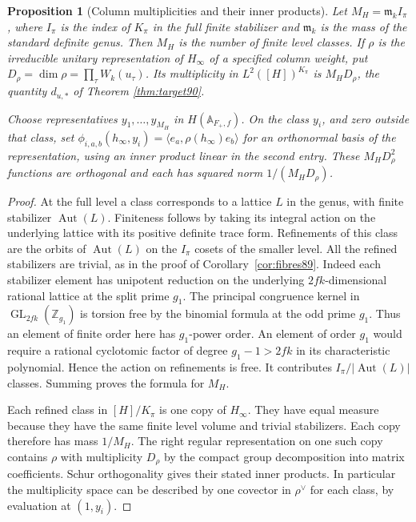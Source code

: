 \documentclass[a4paper,11pt]{article}
\newtheorem{proposition}{Proposition}[section]
\theoremstyle{definition}
\theoremstyle{remark}
\newcommand{\ZZ}{\mathbb Z}\newcommand{\ord}{\operatorname{ord}}
\numberwithin{equation}{section}
\newcommand{\Aut}{\operatorname{Aut}}
\newcommand{\GL}{\operatorname{GL}}
\begin{document}
\begin{proposition}[Column multiplicities and their inner products]\label{prop:column110}
Let \(M_H=\mathfrak m_k I_\pi\), where \(I_\pi\) is the index
of \(K_\pi\) in the full finite stabilizer and \(\mathfrak m_k\)
is the mass of the standard definite genus. Then \(M_H\) is the
number of finite level classes. If \(\rho\) is the irreducible
unitary representation of \(H_\infty\) of a specified column
weight, put \(D_\rho=\dim\rho=\prod_\tau W_k(u_\tau)\).
Its multiplicity in \(L^2([H])^{K_\pi}\) is \(M_HD_\rho\),
the quantity \(d_{u,*}\) of Theorem \ref{thm:target90}.

Choose representatives \(y_1,\ldots,y_{M_H}\) in
\(H(\mathbb A_{F_+,f})\). On the class \(y_i\), and zero outside
that class, set \(\phi_{i,a,b}(h_\infty,y_i)
=\langle e_a,\rho(h_\infty)e_b\rangle\) for an orthonormal
basis of the representation, using an inner product linear in
the second entry. These \(M_HD_\rho^2\) functions are orthogonal
and each has squared norm \(1/(M_HD_\rho)\).
\end{proposition}
\begin{proof}
At the full level a class corresponds to a lattice \(L\) in
the genus, with finite stabilizer \(\Aut(L)\). Finiteness
follows by taking its integral action on the underlying lattice
with its positive definite trace form. Refinements of this class
are the orbits of \(\Aut(L)\) on the \(I_\pi\) cosets of the
smaller level. All the refined stabilizers are trivial, as in
the proof of Corollary~\ref{cor:fibres89}. Indeed each stabilizer element has
unipotent reduction on the underlying \(2fk\)-dimensional
rational lattice at the split prime \(g_1\).
The principal congruence kernel in \(\GL_{2fk}(\ZZ_{g_1})\) is
torsion free by the binomial formula at the odd prime \(g_1\).
Thus an element of finite order here has \(g_1\)-power order.
An element of order \(g_1\) would require a rational cyclotomic
factor of degree \(g_1-1>2fk\) in its characteristic polynomial.
Hence the action on refinements is free. It contributes
\(I_\pi/|\Aut(L)|\) classes. Summing proves the formula for
\(M_H\).

Each refined class in \([H]/K_\pi\) is one copy of \(H_\infty\).
They have equal measure because they have the same finite level
volume and trivial stabilizers. Each copy therefore has mass
\(1/M_H\). The right regular representation on one such copy
contains \(\rho\) with multiplicity \(D_\rho\) by the compact
group decomposition into matrix coefficients. Schur orthogonality
gives their stated inner products. In particular the multiplicity
space can be described by one covector in \(\rho^\vee\) for each
class, by evaluation at \((1,y_i)\).
\end{proof}
\end{document}
